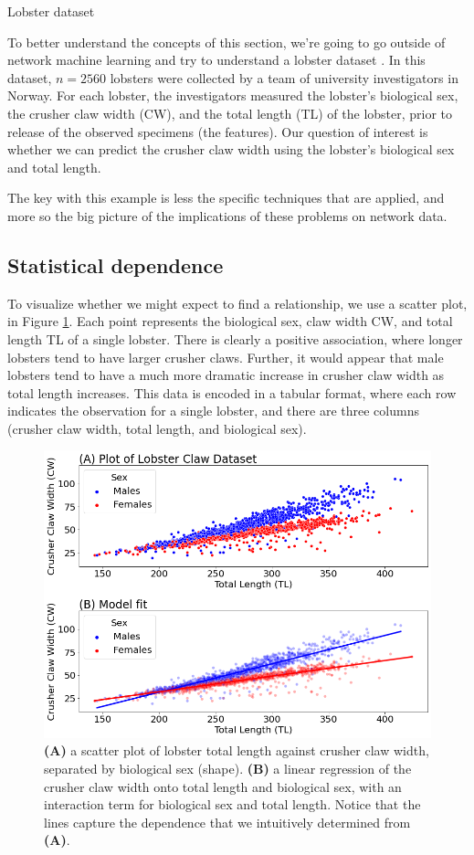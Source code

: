 \begin{floatingbox}[h]\caption{Lobster dataset}
To better understand the concepts of this section, we're going to go outside of network machine learning and try to understand a lobster dataset \cite{Sordalen2020Oct}. In this dataset, $n=2560$ lobsters were collected by a team of university investigators in Norway. For each lobster, the investigators measured the lobster's biological sex, the crusher claw width (CW), and the total length (TL) of the lobster, prior to release of the observed specimens (the features). Our question of interest is whether we can predict the crusher claw width using the lobster's biological sex and total length.
\end{floatingbox}

The key with this example is less the specific techniques that are applied, and more so the big picture of the implications of these problems on network data.

\subsection{Statistical dependence}

To visualize whether we might expect to find a relationship, we use a scatter plot, in Figure \ref{fig:ch5:lobster}. Each point represents the biological sex, claw width CW, and total length TL of a single lobster. There is clearly a positive association, where longer lobsters tend to have larger crusher claws. Further, it would appear that male lobsters tend to have a much more dramatic increase in crusher claw width as total length increases. This data is encoded in a tabular format, where each row indicates the observation for a single lobster, and there are three columns (crusher claw width, total length, and biological sex). 

\begin{figure}[h]
    \centering
    \includegraphics[width=0.7\linewidth]{representations/ch6/Images/lobster.png}
    \caption[Lobster example]{\textbf{(A)} a scatter plot of lobster total length against crusher claw width, separated by biological sex (shape). \textbf{(B)} a linear regression of the crusher claw width onto total length and biological sex, with an interaction term for biological sex and total length. Notice that the lines capture the dependence that we intuitively determined from \textbf{(A)}.}
    \label{fig:ch5:lobster}
\end{figure}


